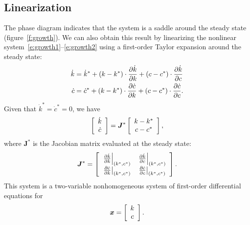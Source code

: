 \documentclass[letterpaper, 11pt, leqno]{article}
\begin{document}
\subsection{Linearization}

The phase diagram indicates that the system is a saddle around the steady state (figure~\ref{f:growth}). We can also obtain this result by linearizing the nonlinear system~\eqref{e:growth1}--\eqref{e:growth2} using a first-order Taylor expansion around the steady state:
\begin{align*}
\dot{k} &=\dot{k}^{*} + (k-k^{*}) \cdot \pd{\dot{k}}{k}+(c-c^{*})\cdot \pd{\dot{k}}{c} \\
\dot{c} &=\dot{c}^{*} + (k-k^{*})\cdot \pd{\dot{c}}{k}+(c-c^{*})\cdot \pd{\dot{c}}{c}.
\end{align*}
Given that $\dot{k}^{*} =\dot{c}^{*} =0$, we have 
\begin{equation*}
\left[ \begin{array}{c}
\dot{k}\\ 
\dot{c}
\end{array} \right] =\bm{J}^{*}\left[ 
\begin{array}{c}
k-k^{*} \\ 
c-c^{*}
\end{array} \right],
\end{equation*}
where $\bm{J}^{*}$ is the Jacobian matrix evaluated at the steady state:
\begin{equation*}
\bm{J}^{*}=\bs{
\begin{array}{cc}
\pd{\dot{k}}{k}{(k^{*},c^{*})} & \pd{\dot{k}}{c}{(k^{*},c^{*})} \\ 
\pd{\dot{c}}{k}{(k^{*},c^{*})} & \pd{\dot{c}}{c}{(k^{*},c^{*})}
\end{array}}.
\end{equation*}
This system is a two-variable nonhomogeneous system of first-order differential equations
for 
\begin{equation*}
\bm{x}=\left[ \begin{array}{c}
k\\ 
c
\end{array} \right].
\end{equation*}
\end{document}
